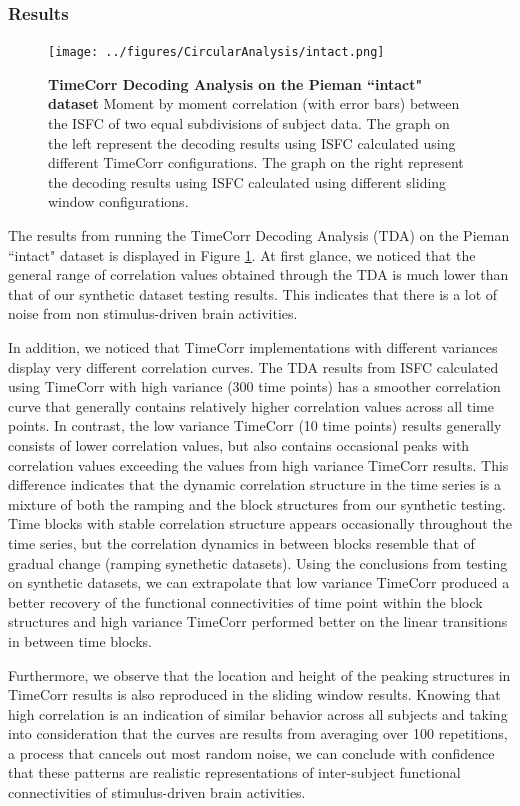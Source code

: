 \documentclass[11pt]{article}
\begin{document}
\subsubsection{Results}


\begin{figure}[!htb]
\texttt{[image: ../figures/CircularAnalysis/intact.png]}
\caption{\textbf{TimeCorr Decoding Analysis on the Pieman ``intact" dataset} Moment by moment correlation (with error bars) between the ISFC of two equal subdivisions of subject data. The graph on the left represent the decoding results using ISFC calculated using different TimeCorr configurations. The graph on the right represent the decoding results using ISFC calculated using different sliding window configurations.}
\label{fig:intact}
\end{figure}

The results from running the TimeCorr Decoding Analysis (TDA) on the Pieman ``intact" dataset is displayed in Figure \ref{fig:intact}. At first glance, we noticed that the general range of correlation values obtained through the TDA is much lower than that of our synthetic dataset testing results. This indicates that there is a lot of noise from non stimulus-driven brain activities.

In addition, we noticed that TimeCorr implementations with different variances display very different correlation curves. The TDA results from ISFC calculated using TimeCorr with high variance (300 time points) has a smoother correlation curve that generally contains relatively higher correlation values across all time points. In contrast, the low variance TimeCorr (10 time points) results generally consists of lower correlation values, but also contains occasional peaks with correlation values exceeding the values from high variance TimeCorr results. This difference indicates that the dynamic correlation structure in the time series is a mixture of both the ramping and the block structures from our synthetic testing. Time blocks with stable correlation structure appears occasionally throughout the time series, but the correlation dynamics in between blocks resemble that of gradual change (ramping synethetic datasets). Using the conclusions from testing on synthetic datasets, we can extrapolate that low variance TimeCorr produced a better recovery of the functional connectivities of time point within the block structures and high variance TimeCorr performed better on the linear transitions in between time blocks.

Furthermore, we observe that the location and height of the peaking structures in TimeCorr results is also reproduced in the sliding window results. Knowing that high correlation is an indication of similar behavior across all subjects and taking into consideration that the curves are results from averaging over 100 repetitions, a process that cancels out most random noise, we can conclude with confidence that these patterns are realistic representations of inter-subject functional connectivities of stimulus-driven brain activities.
\end{document}
